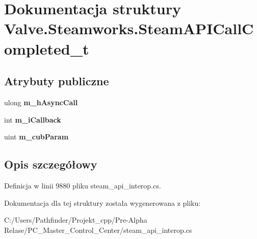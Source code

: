 \hypertarget{struct_valve_1_1_steamworks_1_1_steam_a_p_i_call_completed__t}{}\section{Dokumentacja struktury Valve.\+Steamworks.\+Steam\+A\+P\+I\+Call\+Completed\+\_\+t}
\label{struct_valve_1_1_steamworks_1_1_steam_a_p_i_call_completed__t}
\subsection*{Atrybuty publiczne}
\begin{DoxyCompactItemize}
\item 
\mbox{\label{struct_valve_1_1_steamworks_1_1_steam_a_p_i_call_completed__t_aebf4f3279e7ec6a33b5b76f14632127a}} 
ulong {\bfseries m\+\_\+h\+Async\+Call}
\item 
\mbox{\label{struct_valve_1_1_steamworks_1_1_steam_a_p_i_call_completed__t_a33cfe00621b1bf9834d5720fa4b5b92f}} 
int {\bfseries m\+\_\+i\+Callback}
\item 
\mbox{\label{struct_valve_1_1_steamworks_1_1_steam_a_p_i_call_completed__t_a3d29a096d09ccc2f3cafe32bd71e5d10}} 
uint {\bfseries m\+\_\+cub\+Param}
\end{DoxyCompactItemize}


\subsection{Opis szczegółowy}


Definicja w linii 9880 pliku steam\+\_\+api\+\_\+interop.\+cs.



Dokumentacja dla tej struktury została wygenerowana z pliku\+:\begin{DoxyCompactItemize}
\item 
C\+:/\+Users/\+Pathfinder/\+Projekt\+\_\+cpp/\+Pre-\/\+Alpha Relase/\+P\+C\+\_\+\+Master\+\_\+\+Control\+\_\+\+Center/steam\+\_\+api\+\_\+interop.\+cs\end{DoxyCompactItemize}
